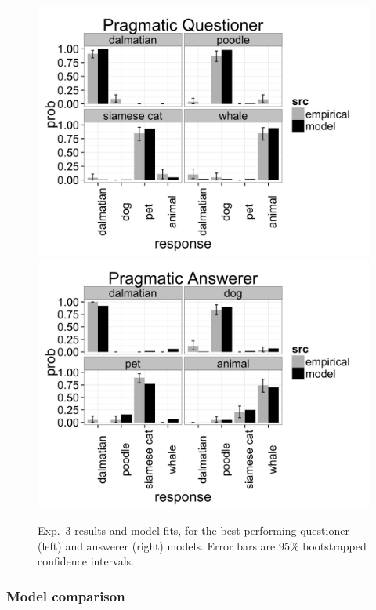 \documentclass[12pt, floatsintext, man]{apa6}
\begin{document}
\begin{figure}[t!]
\begin{center}
\includegraphics[scale = .11]{exp3QuestResultsPragmatic.png}
\includegraphics[scale = .11]{exp3AnsResultsPragmatic.png}
\end{center}
\vspace{-.5cm}
\caption{Exp.~3 results and model fits, for the best-performing questioner (left) and answerer (right) models. Error bars are 95\% bootstrapped confidence intervals.}
\vspace{-.1cm}
\label{fig:exp3res}
\end{figure}

\subsubsection{Model comparison}
\end{document}
